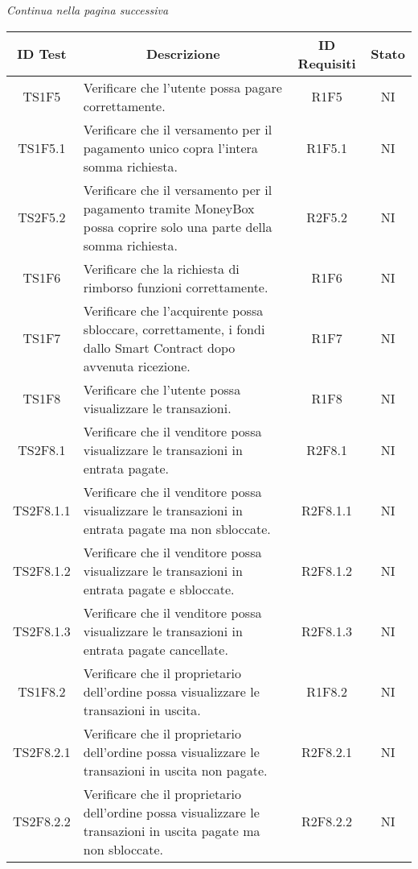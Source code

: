 \begin{center}
  \textit{\small Continua nella pagina successiva}
\end{center}
\begin{table}[H]
  \centering
  \renewcommand{\arraystretch}{1.8}
  \begin{tabular}{c|p{8cm}|c|c}
    \rowcolor[HTML]{125E28}
    \color[HTML]{FFFFFF}\textbf{ID Test}
    & \multicolumn{1}{c}{\color[HTML]{FFFFFF}\textbf{Descrizione}}
    & \color[HTML]{FFFFFF}\textbf{ID Requisiti}
    & \color[HTML]{FFFFFF}\textbf{Stato}\\
    \hline
    TS1F5 &	Verificare che l'utente possa pagare correttamente. &	R1F5 &	NI \\
    TS1F5.1 &	Verificare che il versamento per il pagamento unico copra l'intera somma richiesta. &	R1F5.1 &	NI \\
    TS2F5.2 &	Verificare che il versamento per il pagamento tramite MoneyBox possa coprire solo una parte della somma richiesta. &	R2F5.2 &	NI \\
    TS1F6 &	Verificare che la richiesta di rimborso funzioni correttamente. &	R1F6 &	NI \\
    TS1F7 &	Verificare che l'acquirente possa sbloccare, correttamente, i fondi dallo Smart Contract dopo avvenuta ricezione. &	R1F7 &	NI \\
    TS1F8 &	Verificare che l'utente possa visualizzare le transazioni. &	R1F8 &	NI \\
    TS2F8.1 &	Verificare che il venditore possa visualizzare le transazioni in entrata pagate. & R2F8.1 &	NI \\
    TS2F8.1.1 & Verificare che il venditore possa visualizzare le transazioni in entrata pagate ma non sbloccate. & R2F8.1.1 &	NI \\
    TS2F8.1.2 & Verificare che il venditore possa visualizzare le transazioni in entrata pagate e sbloccate. & R2F8.1.2 &	NI \\
    TS2F8.1.3 & Verificare che il venditore possa visualizzare le transazioni in entrata pagate cancellate. & R2F8.1.3 &	NI \\
    TS1F8.2 &	Verificare che il proprietario dell'ordine possa visualizzare le transazioni in uscita. &	R1F8.2 & NI \\
    TS2F8.2.1 &	Verificare che il proprietario dell'ordine possa visualizzare le transazioni in uscita non pagate. & R2F8.2.1 &	NI \\
    TS2F8.2.2 &	Verificare che il proprietario dell'ordine possa visualizzare le transazioni in uscita pagate ma non sbloccate. &	R2F8.2.2 &	NI \\

\end{tabular}
\end{table}
